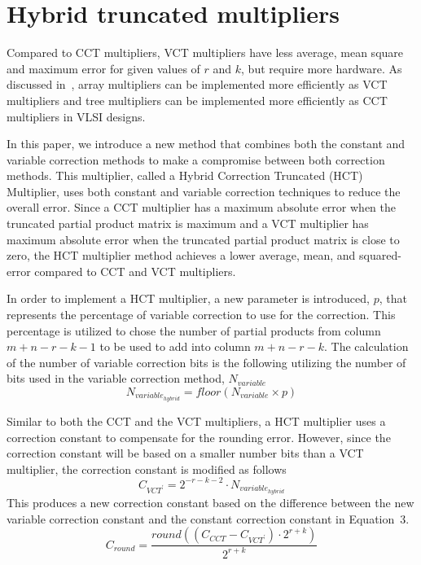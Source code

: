 \section{Hybrid truncated multipliers}

Compared to CCT multipliers, VCT 
multipliers have less average, mean square and maximum error for
given 
values of $r$ and $k$, but require more hardware. As discussed 
in~\cite{schulte20}, 
array multipliers can be implemented more efficiently as VCT
multipliers 
and tree multipliers can be implemented more efficiently as CCT 
multipliers in VLSI designs.

In this paper, we introduce a new method that combines both 
the constant and variable correction methods to make a compromise 
between both
correction methods.  This multiplier, called a Hybrid 
Correction Truncated (HCT) Multiplier, uses both constant and variable
correction techniques to reduce the overall error.
Since a CCT multiplier 
has a maximum absolute error when the truncated partial product matrix
is maximum and a VCT multiplier
has maximum absolute error when the truncated 
partial product matrix is close
to zero, the HCT multiplier 
method achieves a lower average,
mean, and squared-error compared to CCT and VCT multipliers.

In order to implement a HCT multiplier, a new parameter is
introduced, $p$, that represents the percentage of variable correction
to use for the correction.  This percentage is utilized to chose the
number of partial products from column $m+n-r-k-1$ to be used to add 
into column $m+n-r-k$.  The calculation of the number of variable
correction bits is the following utilizing the number of bits used in
the variable correction method, $N_{variable}$
\begin{equation}
N_{variable_{hybrid}} = floor (N_{variable} \times p)
\end{equation}

Similar to both the CCT and the VCT multipliers, a HCT 
multiplier uses a correction constant
to compensate for the rounding error.  However, since the correction
constant will be based on a smaller number bits than a VCT multiplier, the
correction constant is modified as follows
\begin{equation}
C_{VCT^{'}} = 2^{-r-k-2} \cdot N_{variable_{hybrid}}
\end{equation}
This produces a new correction constant based on the difference between
the new variable
correction constant and the constant correction constant in Equation~$3$.
\begin{equation}
C_{round} =  \frac{round ((C_{CCT} - C_{VCT^{'}}) \cdot
2^{r+k})}{2^{r+k}}
\end{equation}

